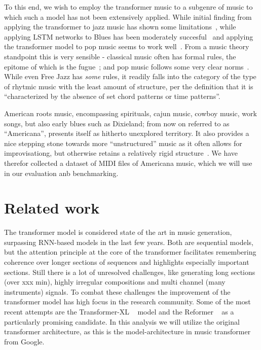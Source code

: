 \documentclass{article}
\begin{document}
        To this end, we wish to employ the transformer music to a subgenre of music 
        to which such a model has not been extensively applied.
        While initial finding from applying the transformer to jazz music has shown 
        some limitations~\cite{wu2020jazz}, while applying LSTM networks to Blues has 
        been moderately succesful~\cite{eck2002bluesLSTM} and applying the transformer 
        model to pop music seems to work well~\cite{huang2020pop}.
        From a music theory standpoint this is very sensible - classical music often has 
        formal rules, the epitome of which is the fugue~\cite{giraud2015computational};
        and pop music follows some very clear norms~\cite{hennion1983production}. While 
        even Free Jazz has \emph{some} rules, it readily falls into the category of the 
        type of rhytmic music with the least amount of structure, per the definition
        that it is ``characterized by the absence of set chord patterns or
        time patterns''\cite{FreeJazz}.

        American roots music, encompassing spirituals, cajun music, cowboy music, work songs,
        but also early blues such as Dixieland; from now on referred to as ``Americana'', presents 
        itself as hitherto unexplored territory. It also provides a nice stepping stone
        towards more ``unstructured'' music as it often allows for improvisationg, but 
        otherwise retains a relatively rigid structure~\cite{libcong}.
        We have therefor collected a dataset of MIDI files of Americana music, which we
        will use in our evaluation anb benchmarking.

    \section{Related work}
       The transformer model is considered state of the art in music generation,
       surpassing RNN-based models in the last few years. Both are sequential models,
       but the attention principle at the core of the transformer facilitates
       remembering coherence over longer sections of sequences and highlights
       especially important sections. Still there is a lot of unresolved challenges,
       like generating long sections (over xxx min), highly irregular compositions
       and multi channel (many instruments) signals. To combat these challenges the
       improvement of the transformer model has high focus in the research community.
       Some of the most recent attempts are the Transformer-XL ~\cite{dai2019transformerxl} 
       model and the Reformer ~\cite{kitaev2020reformer} as a particularly promising candidate. In          
       this analysis we will utilize the original transformer architecture, as this is the
       model-architecture in music transformer from Google.
        
\end{document}
